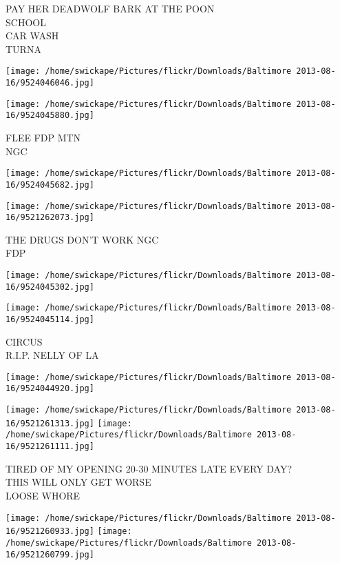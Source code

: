 \documentclass[10pt,letterpaper]{article}
\begin{document}
PAY HER DEADWOLF BARK AT THE POON\\
SCHOOL\\
CAR WASH\\
TURNA\\
\pagebreak

\texttt{[image: /home/swickape/Pictures/flickr/Downloads/Baltimore 2013-08-16/9524046046.jpg]}

\vspace{0.25in}
\texttt{[image: /home/swickape/Pictures/flickr/Downloads/Baltimore 2013-08-16/9524045880.jpg]}

FLEE FDP MTN\\
NGC\\
\pagebreak

\texttt{[image: /home/swickape/Pictures/flickr/Downloads/Baltimore 2013-08-16/9524045682.jpg]}

\vspace{0.25in}
\texttt{[image: /home/swickape/Pictures/flickr/Downloads/Baltimore 2013-08-16/9521262073.jpg]}

THE DRUGS DON'T WORK NGC\\
FDP\\
\pagebreak

\texttt{[image: /home/swickape/Pictures/flickr/Downloads/Baltimore 2013-08-16/9524045302.jpg]}

\vspace{0.25in}
\texttt{[image: /home/swickape/Pictures/flickr/Downloads/Baltimore 2013-08-16/9524045114.jpg]}

CIRCUS\\
R.I.P. NELLY OF LA\\
\pagebreak

\texttt{[image: /home/swickape/Pictures/flickr/Downloads/Baltimore 2013-08-16/9524044920.jpg]}

\vspace{0.25in}
\texttt{[image: /home/swickape/Pictures/flickr/Downloads/Baltimore 2013-08-16/9521261313.jpg]}
\texttt{[image: /home/swickape/Pictures/flickr/Downloads/Baltimore 2013-08-16/9521261111.jpg]}

TIRED OF MY OPENING 20{-}30 MINUTES LATE EVERY DAY?\\
THIS WILL ONLY GET WORSE\\
LOOSE WHORE\\
\pagebreak

\texttt{[image: /home/swickape/Pictures/flickr/Downloads/Baltimore 2013-08-16/9521260933.jpg]}
\texttt{[image: /home/swickape/Pictures/flickr/Downloads/Baltimore 2013-08-16/9521260799.jpg]}
\end{document}

